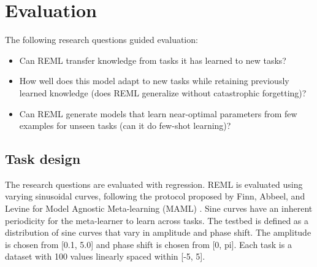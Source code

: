 \chapter{Evaluation}
\label{Evaluation}
The following research questions guided evaluation:
\begin{itemize}
    \item Can REML transfer knowledge from tasks it has learned 
    to new tasks?
    \item How well does this model adapt to new tasks while retaining
    previously learned knowledge (does REML generalize without
    catastrophic forgetting)?
    \item Can REML generate models that learn near-optimal parameters 
    from few examples for unseen tasks (can it do few-shot learning)? 
\end{itemize}

\section{Task design}
The research questions are evaluated with regression. 
REML is evaluated using varying sinusoidal curves, following the protocol 
proposed by Finn, Abbeel, and Levine for Model Agnostic Meta-learning (MAML) 
\cite{FinAbbLev:17}. Sine curves have an inherent periodicity for the meta-learner
to learn across tasks.
The testbed is defined as a distribution of sine curves that vary in 
amplitude and phase shift. The amplitude is chosen from [0.1, 5.0] and 
phase shift is chosen from [0, pi]. Each task is a dataset with 100
values linearly spaced within [-5, 5]. 


